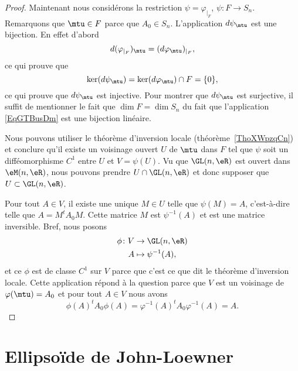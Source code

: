 \begin{proof}
    Maintenant nous considérons la restriction \( \psi=\varphi_{|_F}\), \( \psi\colon F\to S_n\). Remarquons que \( \mtu\in F\) parce que \( A_0\in S_n\). L'application \( d\psi_{\mtu}\) est une bijection. En effet d'abord
    \begin{equation}
        d(\varphi_{|_F})_{\mtu}=(d\varphi_{\mtu})_{|_F},
    \end{equation}
    ce qui prouve que
    \begin{equation}
        \ker(d\psi_{\mtu})=\ker(d\varphi_{\mtu})\cap F=\{ 0 \},
    \end{equation}
    ce qui prouve que \( d\psi_{\mtu}\) est injective. Pour montrer que \( d\psi_{\mtu}\) est surjective, il suffit de mentionner le fait que \( \dim F=\dim S_n\) du fait que l'application \eqref{EqGTBusDm} est une bijection linéaire.

    Nous pouvons utiliser le théorème d'inversion locale (théorème~\ref{ThoXWpzqCn}) et conclure qu'il existe un voisinage ouvert \( U\) de \( \mtu\) dans \( F\) tel que \( \psi\) soit un difféomorphisme \( C^1\) entre \( U\) et \( V=\psi(U)\). Vu que \( \GL(n,\eR)\) est ouvert dans \( \eM(n,\eR)\), nous pouvons prendre \( U\cap \GL(n,\eR)\) et donc supposer que \( U\subset \GL(n,\eR)\).

    Pour tout \( A\in V\), il existe une unique \( M\in U\) telle que \( \psi(M)=A\), c'est-à-dire telle que \( A=M^tA_0M\). Cette matrice \( M\) est \( \psi^{-1}(A)\) et est une matrice inversible. Bref, nous posons
    \begin{equation}
        \begin{aligned}
            \phi\colon V&\to \GL(n,\eR) \\
            A&\mapsto \psi^{-1}(A),
        \end{aligned}
    \end{equation}
    et ce \( \phi\) est de classe \( C^1\) sur \( V\) parce que c'est ce que dit le théorème d'inversion locale. Cette application répond à la question parce que \( V\) est un voisinage de \( \varphi(\mtu)=A_0\) et pour tout \( A\in V\) nous avons
    \begin{equation}
        \phi(A)^tA_0\phi(A)=\varphi^{-1}(A)^tA_0\varphi^{-1}(A)=A.
    \end{equation}
\end{proof}

\section{Ellipsoïde de John-Loewner}

